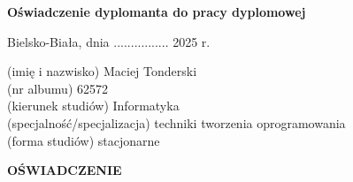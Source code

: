 \begin{center}
\textbf{\large Oświadczenie dyplomanta do pracy dyplomowej}
\end{center}
\hfill Bielsko-Biała, dnia ................ 2025 r.

\vspace{0.1cm}

\noindent (imię i nazwisko) Maciej Tonderski\\
(nr albumu) 62572\\
(kierunek studiów) Informatyka\\
(specjalność/specjalizacja) techniki tworzenia oprogramowania\\
(forma studiów) stacjonarne\\
\begin{center}
\textbf{\Large OŚWIADCZENIE}
\end{center}
\vspace{0.1cm}
